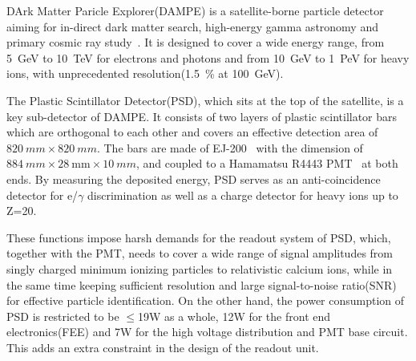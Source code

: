 \documentclass[5p, times]{elsarticle}
\begin{document}
DArk Matter Paricle Explorer(DAMPE) is a satellite-borne particle detector aiming for in-direct dark matter search, high-energy gamma astronomy and primary cosmic ray study~\cite{Chang_Jin_dampe}.
It is designed to cover a wide energy range, from \SI{5}{GeV} to \SI{10}{TeV} for electrons and photons and from \SI{10}{GeV} to \SI{1}{PeV} for heavy ions, with unprecedented resolution(\SI{1.5}{\percent} at \SI{100}{\giga\electronvolt}).

The Plastic Scintillator Detector(PSD), which sits at the top of the satellite, is a key sub-detector of DAMPE.
It consists of two layers of plastic scintillator bars which are orthogonal to each other and covers an effective detection area of $\SI{820}{mm}\times\SI{820}{mm}$.
The bars are made of EJ-200~\cite{scintillator} with the dimension of $\SI{884}{mm} \times \SI{28}{\milli\meter} \times \SI{10}{mm}$, and coupled to a Hamamatsu R4443 PMT~\cite{r4443} at both ends.
By measuring the deposited energy, PSD serves as an anti-coincidence detector for e/$\gamma$ discrimination as well as a charge detector for heavy ions up to Z=20.

These functions impose harsh demands for the readout system of PSD, which, together with the PMT, needs to cover a wide range of signal amplitudes from singly charged minimum ionizing particles to relativistic calcium ions, while in the same time keeping sufficient resolution and large signal-to-noise ratio(SNR) for effective particle identification. 
On the other hand, the power consumption of PSD is restricted to be $\leq$19W as a whole, 12W for the front end electronics(FEE) and 7W for the high voltage distribution and PMT base circuit.
This adds an extra constraint in the design of the readout unit.

\end{document}
